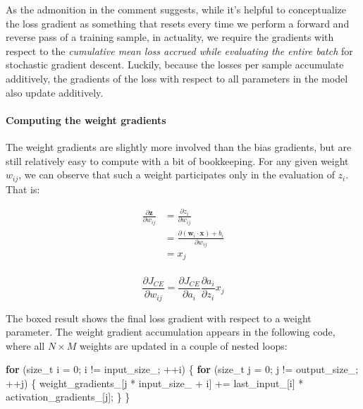 \documentclass[
]{article}
\newenvironment{Shaded}{}{}
\newcommand{\ControlFlowTok}[1]{\textcolor[rgb]{0.00,0.44,0.13}{\textbf{#1}}}
\newcommand{\DataTypeTok}[1]{\textcolor[rgb]{0.56,0.13,0.00}{#1}}
\newcommand{\DecValTok}[1]{\textcolor[rgb]{0.25,0.63,0.44}{#1}}
\newcommand{\NormalTok}[1]{#1}
\newcommand{\VariableTok}[1]{\textcolor[rgb]{0.10,0.09,0.49}{#1}}
\begin{document}
As the admonition in the comment suggests, while it's helpful to
conceptualize the loss gradient as something that resets every time we
perform a forward and reverse pass of a training sample, in actuality,
we require the gradients with respect to the \emph{cumulative mean loss
accrued while evaluating the entire batch} for stochastic gradient
descent. Luckily, because the losses per sample accumulate additively,
the gradients of the loss with respect to all parameters in the model
also update additively.

\hypertarget{computing-the-weight-gradients}{%
\paragraph{Computing the weight
gradients}\label{computing-the-weight-gradients}}

The weight gradients are slightly more involved than the bias gradients,
but are still relatively easy to compute with a bit of bookkeeping. For
any given weight \(w_{ij}\), we can observe that such a weight
participates only in the evaluation of \(z_i\). That is:

\[
\begin{aligned}
\frac{\partial \mathbf{z}}{\partial w_{ij}} &= \frac{\partial z_i}{\partial w_{ij}} \\
&= \frac{\partial (\mathbf{w}_{i} \cdot \mathbf{x}) + b_i}{\partial w_{ij}} \\
&= x_j \\
\end{aligned}
\]

\[
\boxed{\frac{\partial J_{CE}}{\partial w_{ij}} = \frac{\partial J_{CE}}{\partial a_i}\frac{\partial a_i}{\partial z_i}x_j}
\]

The boxed result shows the final loss gradient with respect to a weight
parameter. The weight gradient accumulation appears in the following
code, where all \(N \times M\) weights are updated in a couple of nested
loops:

\begin{Shaded}
\begin{Highlighting}[]
    \ControlFlowTok{for}\NormalTok{ (}\DataTypeTok{size\_t}\NormalTok{ i = }\DecValTok{0}\NormalTok{; i != }\VariableTok{input\_size\_}\NormalTok{; ++i)}
\NormalTok{    \{}
        \ControlFlowTok{for}\NormalTok{ (}\DataTypeTok{size\_t}\NormalTok{ j = }\DecValTok{0}\NormalTok{; j != }\VariableTok{output\_size\_}\NormalTok{; ++j)}
\NormalTok{        \{}
            \VariableTok{weight\_gradients\_}\NormalTok{[j * }\VariableTok{input\_size\_}\NormalTok{ + i]}
\NormalTok{                += }\VariableTok{last\_input\_}\NormalTok{[i] * }\VariableTok{activation\_gradients\_}\NormalTok{[j];}
\NormalTok{        \}}
\NormalTok{    \}}
\end{Highlighting}
\end{Shaded}
\end{document}
